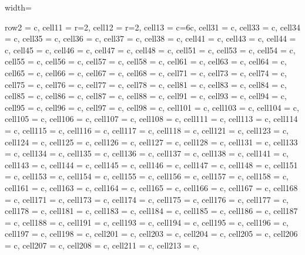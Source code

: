 \documentclass[journal]{IEEEtran}
\begin{document}
\begin{table}
\caption{External Similarity and Diversity metrics for experimental datasets.}
\centering
\begin{adjustbox}{width=\textwidth}
\begin{tblr}{
  row{2} = {c}, cell{1}{1} = {r=2}{}, cell{1}{2} = {r=2}{}, cell{1}{3} = {c=6}{c}, cell{3}{1} = {c}, cell{3}{3} = {c}, cell{3}{4} = {c}, cell{3}{5} = {c}, cell{3}{6} = {c}, cell{3}{7} = {c}, cell{3}{8} = {c}, cell{4}{1} = {c},
  cell{4}{3} = {c}, cell{4}{4} = {c}, cell{4}{5} = {c}, cell{4}{6} = {c}, cell{4}{7} = {c}, cell{4}{8} = {c}, cell{5}{1} = {c}, cell{5}{3} = {c}, cell{5}{4} = {c}, cell{5}{5} = {c}, cell{5}{6} = {c}, cell{5}{7} = {c},
  cell{5}{8} = {c}, cell{6}{1} = {c}, cell{6}{3} = {c}, cell{6}{4} = {c}, cell{6}{5} = {c}, cell{6}{6} = {c}, cell{6}{7} = {c}, cell{6}{8} = {c}, cell{7}{1} = {c}, cell{7}{3} = {c}, cell{7}{4} = {c}, cell{7}{5} = {c},
  cell{7}{6} = {c}, cell{7}{7} = {c}, cell{7}{8} = {c}, cell{8}{1} = {c}, cell{8}{3} = {c}, cell{8}{4} = {c}, cell{8}{5} = {c}, cell{8}{6} = {c}, cell{8}{7} = {c}, cell{8}{8} = {c}, cell{9}{1} = {c}, cell{9}{3} = {c},
  cell{9}{4} = {c}, cell{9}{5} = {c}, cell{9}{6} = {c}, cell{9}{7} = {c}, cell{9}{8} = {c}, cell{10}{1} = {c}, cell{10}{3} = {c}, cell{10}{4} = {c}, cell{10}{5} = {c}, cell{10}{6} = {c}, cell{10}{7} = {c}, cell{10}{8} = {c},
  cell{11}{1} = {c}, cell{11}{3} = {c}, cell{11}{4} = {c}, cell{11}{5} = {c}, cell{11}{6} = {c}, cell{11}{7} = {c}, cell{11}{8} = {c}, cell{12}{1} = {c}, cell{12}{3} = {c}, cell{12}{4} = {c}, cell{12}{5} = {c}, cell{12}{6} = {c},
  cell{12}{7} = {c}, cell{12}{8} = {c}, cell{13}{1} = {c}, cell{13}{3} = {c},  cell{13}{4} = {c}, cell{13}{5} = {c}, cell{13}{6} = {c}, cell{13}{7} = {c}, cell{13}{8} = {c}, cell{14}{1} = {c}, cell{14}{3} = {c}, cell{14}{4} = {c},
  cell{14}{5} = {c}, cell{14}{6} = {c}, cell{14}{7} = {c}, cell{14}{8} = {c}, cell{15}{1} = {c}, cell{15}{3} = {c}, cell{15}{4} = {c}, cell{15}{5} = {c}, cell{15}{6} = {c}, cell{15}{7} = {c}, cell{15}{8} = {c}, cell{16}{1} = {c},
  cell{16}{3} = {c}, cell{16}{4} = {c}, cell{16}{5} = {c}, cell{16}{6} = {c}, cell{16}{7} = {c}, cell{16}{8} = {c}, cell{17}{1} = {c}, cell{17}{3} = {c}, cell{17}{4} = {c}, cell{17}{5} = {c}, cell{17}{6} = {c}, cell{17}{7} = {c},
  cell{17}{8} = {c}, cell{18}{1} = {c}, cell{18}{3} = {c}, cell{18}{4} = {c}, cell{18}{5} = {c}, cell{18}{6} = {c}, cell{18}{7} = {c}, cell{18}{8} = {c}, cell{19}{1} = {c}, cell{19}{3} = {c}, cell{19}{4} = {c}, cell{19}{5} = {c},
  cell{19}{6} = {c}, cell{19}{7} = {c}, cell{19}{8} = {c}, cell{20}{1} = {c}, cell{20}{3} = {c}, cell{20}{4} = {c}, cell{20}{5} = {c}, cell{20}{6} = {c}, cell{20}{7} = {c}, cell{20}{8} = {c}, cell{21}{1} = {c}, cell{21}{3} = {c},
}
\end{tblr}
\end{adjustbox}
\end{table}
\end{document}
